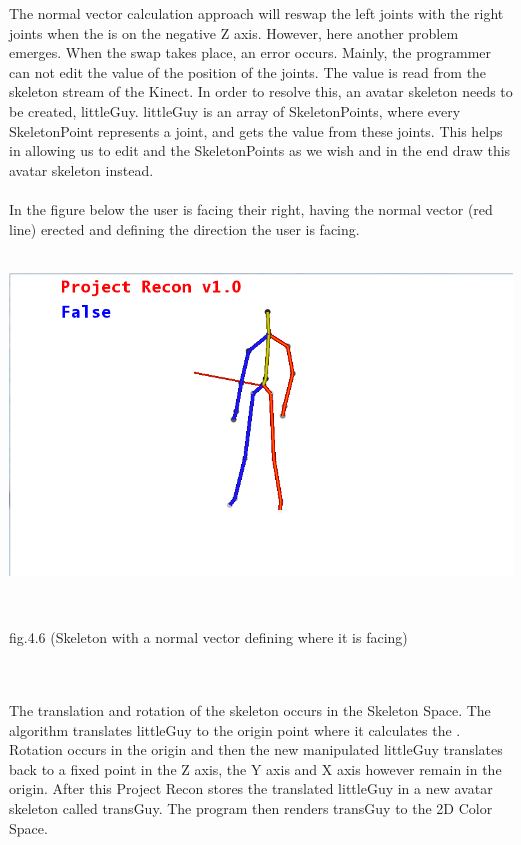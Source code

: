 
The normal vector calculation approach will reswap the left joints with the right joints when the \N is on the negative Z axis. 
However, here another problem emerges. When the swap takes place, an error occurs. Mainly, the programmer can not 
edit the value of the position of the joints. The value is read from the skeleton 
stream of the Kinect. In order to resolve this, an avatar skeleton needs to be 
created, littleGuy. littleGuy is an array of SkeletonPoints, where every 
SkeletonPoint represents a joint, and gets the value from these joints. This 
helps in allowing us to edit and the SkeletonPoints as we wish and in the end 
draw this avatar skeleton instead.
\\
\\
In the figure below the user is facing their right, having the normal vector (red 
line) erected and defining the direction the user is facing.
\\
\\
\centerline{\includegraphics[scale=0.5]{images/skeleton_normal.png}}
\\
\centerline{fig.4.6 (Skeleton with a normal vector defining where it is facing)}
\\
\\
The translation and rotation of the skeleton occurs in the Skeleton Space. The algorithm translates littleGuy to the origin point where it calculates the \N. Rotation occurs in the origin and then the new manipulated littleGuy translates back to a fixed point in the Z axis, the Y axis and X axis however remain in the origin. After this Project Recon stores the translated littleGuy in a new avatar skeleton called transGuy. The program then renders transGuy to the 2D Color Space. 
